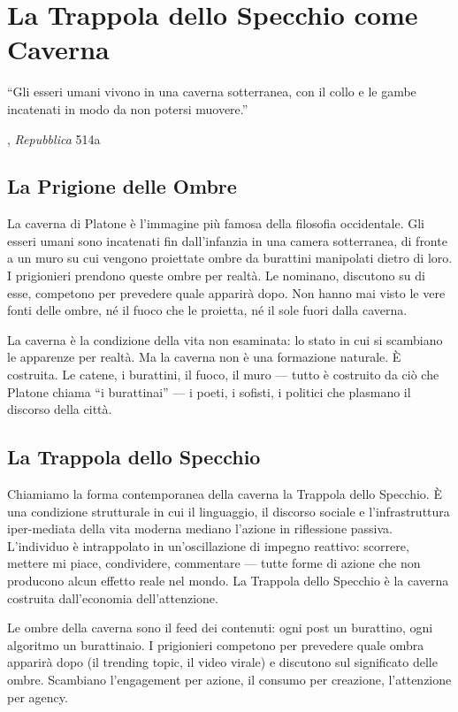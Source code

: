 \chapter{La Trappola dello Specchio come Caverna}

\epigraph{``Gli esseri umani vivono in una caverna sotterranea, con il collo e le
gambe incatenati in modo da non potersi muovere.''}{\textcite{plato1997complete}, \emph{Repubblica} 514a}

\section{La Prigione delle Ombre}

La caverna di Platone \`e l'immagine pi\`u famosa della filosofia
occidentale. Gli esseri umani sono incatenati fin dall'infanzia in una
camera sotterranea, di fronte a un muro su cui vengono proiettate ombre
da burattini manipolati dietro di loro. I prigionieri prendono queste
ombre per realt\`a. Le nominano, discutono su di esse, competono per
prevedere quale apparir\`a dopo. Non hanno mai visto le vere fonti delle
ombre, n\'e il fuoco che le proietta, n\'e il sole fuori dalla caverna.

La caverna \`e la condizione della vita non esaminata: lo stato in cui
si scambiano le apparenze per realt\`a. Ma la caverna non \`e una
formazione naturale. \`E costruita. Le catene, i burattini, il fuoco,
il muro --- tutto \`e costruito da ci\`o che Platone chiama ``i
burattinai'' --- i poeti, i sofisti, i politici che plasmano il discorso
della citt\`a.

\section{La Trappola dello Specchio}

Chiamiamo la forma contemporanea della caverna la Trappola dello
Specchio. \`E una condizione strutturale in cui il linguaggio, il
discorso sociale e l'infrastruttura iper-mediata della vita moderna
mediano l'azione in riflessione passiva. L'individuo \`e intrappolato
in un'oscillazione di impegno reattivo: scorrere, mettere mi piace,
condividere, commentare --- tutte forme di azione che non producono
alcun effetto reale nel mondo. La Trappola dello Specchio \`e la caverna
costruita dall'economia dell'attenzione.

Le ombre della caverna sono il feed dei contenuti: ogni post un
burattino, ogni algoritmo un burattinaio. I prigionieri competono per
prevedere quale ombra apparir\`a dopo (il trending topic, il video
virale) e discutono sul significato delle ombre. Scambiano
l'engagement per azione, il consumo per creazione, l'attenzione per
agency.


